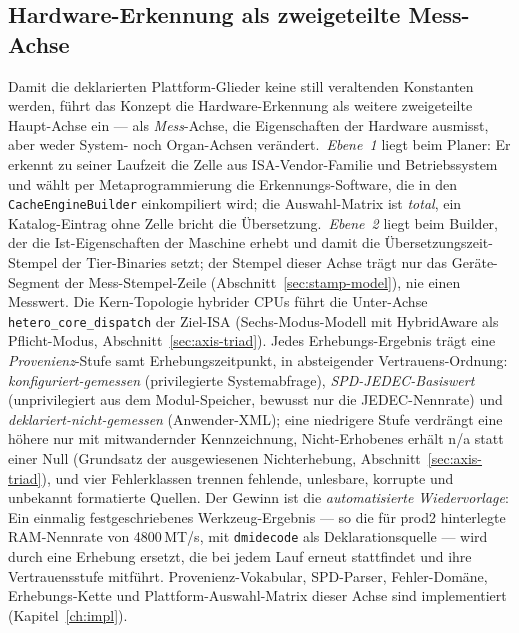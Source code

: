 \begin{nurkurz}
\subsection{Hardware-Erkennung als zweigeteilte Mess-Achse}\label{sec:hw-probe}
Damit die deklarierten Plattform-Glieder keine still veraltenden Konstanten werden, führt das Konzept die
Hardware-Erkennung als weitere zweigeteilte Haupt-Achse ein --- als \emph{Mess}-Achse, die Eigenschaften der
Hardware ausmisst, aber weder System- noch Organ-Achsen verändert.\ \emph{Ebene~1} liegt beim Planer: Er erkennt
zu seiner Laufzeit die Zelle aus ISA-Vendor-Familie und Betriebssystem und wählt per Metaprogrammierung die
Erkennungs-Software, die in den \texttt{CacheEngineBuilder} einkompiliert wird; die Auswahl-Matrix ist
\emph{total}, ein Katalog-Eintrag ohne Zelle bricht die Übersetzung.\ \emph{Ebene~2} liegt beim Builder, der die
Ist-Eigenschaften der Maschine erhebt und damit die Übersetzungszeit-Stempel der Tier-Binaries setzt; der
Stempel dieser Achse trägt nur das Geräte-Segment der Mess-Stempel-Zeile (Abschnitt~\ref{sec:stamp-model}),
nie einen Messwert. Die Kern-Topologie hybrider CPUs führt die Unter-Achse \texttt{hetero\_core\_dispatch} der
Ziel-ISA (Sechs-Modus-Modell mit HybridAware als Pflicht-Modus, Abschnitt~\ref{sec:axis-triad}). Jedes
Erhebungs-Ergebnis trägt eine \emph{Provenienz}-Stufe samt Erhebungszeitpunkt, in absteigender
Vertrauens-Ordnung: \emph{konfiguriert-gemessen} (privilegierte Systemabfrage), \emph{SPD-JEDEC-Basiswert}
(unprivilegiert aus dem Modul-Speicher, bewusst nur die JEDEC-Nennrate) und \emph{deklariert-nicht-gemessen}
(Anwender-XML); eine niedrigere Stufe verdrängt eine höhere nur mit mitwandernder Kennzeichnung,
Nicht-Erhobenes erhält n/a statt einer Null (Grundsatz der ausgewiesenen Nichterhebung,
Abschnitt~\ref{sec:axis-triad}), und vier Fehlerklassen trennen fehlende, unlesbare, korrupte und unbekannt
formatierte Quellen. Der Gewinn ist die \emph{automatisierte Wiedervorlage}: Ein einmalig festgeschriebenes
Werkzeug-Ergebnis --- so die für prod2 hinterlegte RAM-Nennrate von 4800\,MT/s, mit \texttt{dmidecode} als
Deklarationsquelle --- wird durch eine Erhebung ersetzt, die bei jedem Lauf erneut stattfindet und ihre
Vertrauensstufe mitführt. Provenienz-Vokabular, SPD-Parser, Fehler-Domäne, Erhebungs-Kette und
Plattform-Auswahl-Matrix dieser Achse sind implementiert (Kapitel~\ref{ch:impl}).

\end{nurkurz}
